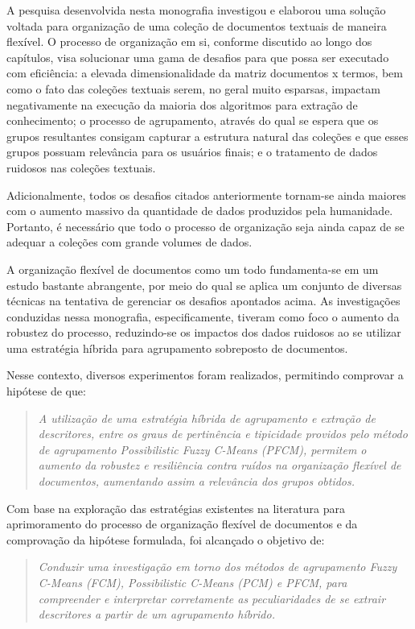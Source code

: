 A pesquisa desenvolvida nesta monografia investigou e elaborou uma solução voltada para organização de uma coleção de documentos textuais de maneira flexível. O processo de organização em si, conforme
discutido ao longo dos capítulos, visa solucionar uma gama de desafios para que possa ser executado com eficiência:
a elevada dimensionalidade da matriz documentos x termos, bem como o fato das coleções textuais serem, no geral muito esparsas, impactam negativamente na execução da maioria dos algoritmos para extração de conhecimento; o processo de agrupamento, através do qual se espera que os grupos resultantes consigam capturar a estrutura natural das coleções e que esses
grupos possuam relevância para os usuários finais; e o tratamento de dados ruidosos nas coleções textuais.

Adicionalmente, todos os desafios citados anteriormente tornam-se ainda maiores com o aumento massivo da quantidade de dados produzidos pela humanidade. Portanto, é necessário que todo o processo de organização seja ainda capaz de se adequar a coleções com grande volumes de dados.

A organização flexível de documentos como um todo fundamenta-se em um estudo bastante
abrangente, por meio do qual se aplica um conjunto de diversas técnicas na tentativa de gerenciar os desafios apontados acima.
As investigações conduzidas nessa monografia, especificamente, tiveram como foco o aumento da
robustez do processo, reduzindo-se os impactos dos dados ruidosos ao se utilizar uma estratégia
híbrida para agrupamento sobreposto de documentos.

Nesse contexto, diversos experimentos foram realizados, permitindo comprovar a hipótese de que:

\begin{quote}
\textit{A utilização de uma estratégia híbrida de agrupamento e extração de descritores, entre os 
  graus de pertinência e tipicidade providos pelo método de agrupamento {\it Possibilistic Fuzzy C-Means} (PFCM), permitem o aumento da robustez e resiliência contra ruídos na organização flexível de documentos, aumentando assim a
    relevância dos grupos obtidos.}
\end{quote}

Com base na exploração das estratégias existentes na literatura para aprimoramento do
processo de organização flexível de documentos e da comprovação da hipótese formulada, foi alcançado o objetivo
de:

\begin{quote}
\textit{Conduzir uma investigação em torno dos métodos de agrupamento Fuzzy C-Means (FCM), Possibilistic C-Means (PCM) e PFCM, para compreender e interpretar corretamente as peculiaridades de se extrair descritores a partir de um
agrupamento híbrido.}
\end{quote}

